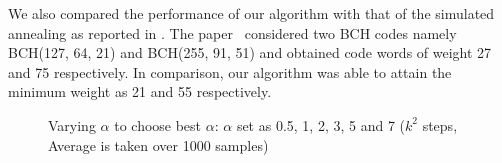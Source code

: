 \documentclass{sig-alternate-2013}
\begin{document}



We also compared the performance of our algorithm with that of the
simulated annealing as reported in \cite{ant}. The paper~\cite{ant}
considered two BCH codes namely BCH(127, 64, 21) and BCH(255, 91, 51)
and obtained code words of weight 27 and 75 respectively. In
comparison, our algorithm was able to attain the minimum weight as 21
and 55 respectively.

\begin{figure*}
\centering
{}
\caption{Varying $\alpha$ to choose best $\alpha$: $\alpha$ set as
  0.5, 1, 2, 3, 5 and 7 ($k^2$ steps, Average is taken over 1000
  samples)}
\label{alpa}
\end{figure*}
\end{document}
